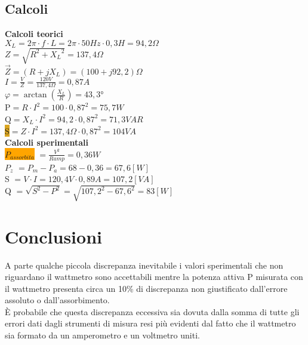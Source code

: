 \documentclass[12pt]{article}
\begin{document}
    \subsection{Calcoli}
    \begin{center}
        \textbf{Calcoli teorici}\\
        \vspace{0.5 cm}
        $X_L = 2\pi \cdot f \cdot L = 2\pi \cdot 50 Hz \cdot 0,3 H= 94,2 \Omega$\\
        $Z=\sqrt{R^2 + {X_L}^2}=137,4 \Omega$\\
        $\vec{Z}=(R+jX_L)=(100+j92,2)\Omega$\\
        $I=\frac{V}{Z}=\frac{120 V}{137,4 \Omega}=0,87 A$\\
    \vspace{0.5 cm}
        $\varphi=\arctan(\frac{X_L}{R})=43,3$°\\
    \vspace{0.5 cm}
        \colorbox{RedOrange}{P}$=R\cdot I^2= 100 \cdot 0,87^2=75,7W$\\
        \colorbox{Dandelion}{Q}$=X_L \cdot  I^2=94,2 \cdot 0,87^2= 71,3 VAR $\\
        \colorbox{Goldenrod}{S}$=Z \cdot I^2= 137,4 \Omega \cdot 0,87^2=104 VA$\\
    \vspace{1 cm}
        \textbf{Calcoli sperimentali}\\
       \colorbox{Orange}{$P_{assorbita}$} $=\frac{V^2}{Ramp}=0,36 W$\\
       \colorbox{Peach}{$P_z$} $=P_m - P_a=68-0,36=67,6[W]$\\
       \vspace{10 mm}
       \colorbox{TealBlue}{S} $=V\cdot I=120,4V \cdot 0,89 A =107,2 [VA]$\\
       
        
       \colorbox{Blue!76}{Q} $=\sqrt{S^2 - P^2}=\sqrt{107,2^2 - 67,6^2}=83 [W] $\\%
    \end{center}
\section{Conclusioni}
A parte qualche piccola discrepanza inevitabile i valori sperimentali che non riguardano il wattmetro sono accettabili mentre la potenza attiva
P misurata con il wattmetro presenta circa un 10\% di discrepanza non giustificato dall'errore assoluto o dall'assorbimento.\\
È probabile che questa discrepanza eccessiva sia dovuta dalla somma di tutte gli errori dati dagli strumenti di misura resi più evidenti dal fatto che 
il wattmetro sia formato da un amperometro e un voltmetro uniti.
\end{document}
